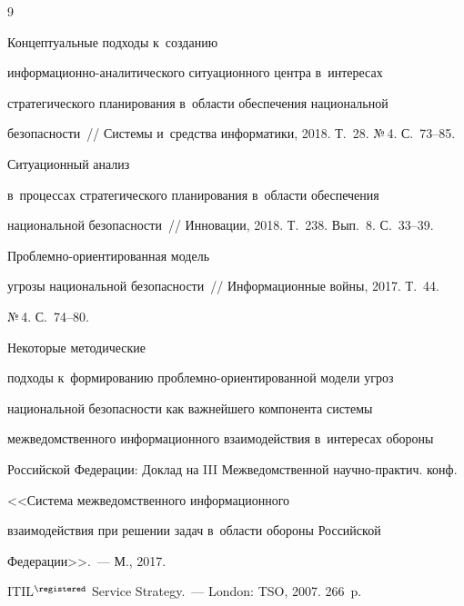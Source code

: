 {\small\frenchspacing


{%




\begin{thebibliography}{9}




 Концептуальные подходы к~созданию 


ин\-фор\-ма\-ци\-он\-но-ана\-ли\-ти\-че\-ско\-го ситуационного центра в~интересах 


стратегического планирования в~области обеспечения национальной 


безопасности~/\!\!/ Системы и~средства информатики, 2018. Т.~28. №\,4. С.~73--85.




 Ситуационный анализ 


в~процессах стратегического планирования в~об\-ласти обеспечения 


национальной безопасности~/\!\!/ Инновации, 2018. Т.~238. Вып.~8. С.~33--39.




 Проб\-лем\-но-ори\-ен\-ти\-ро\-ван\-ная модель 


угрозы национальной безопас\-ности~/\!\!/ Информационные войны, 2017. Т.~44. 


№\,4. С.~74--80.




 Некоторые методические 


подходы к~формированию проб\-лем\-но-ори\-ен\-ти\-ро\-ван\-ной модели угроз 


национальной безопас\-ности как важнейшего компонента сис\-те\-мы 


межведомственного информационного взаимодействия в~интересах обороны 


Российской Федерации: Доклад на III Межведомственной на\-уч\-но-практич. конф.


 <<Система межведомственного информационного 


взаимодействия при решении задач в~об\-ласти обороны Российской 


Федерации>>.~--- М., 2017.




ITIL$^\registered$ Service Strategy.~--- London: TSO, 2007. 266~p.


           \end{thebibliography}


} }








